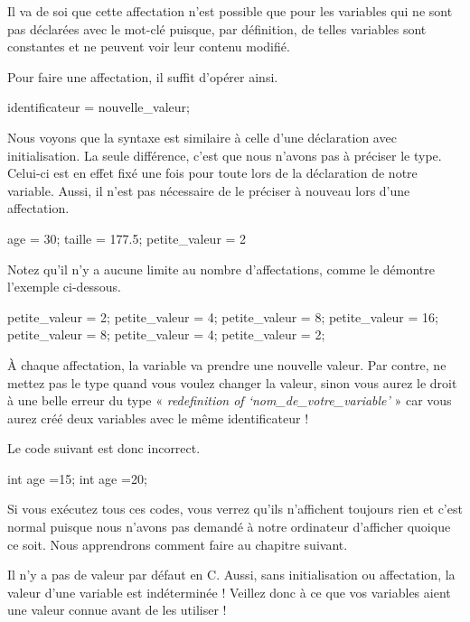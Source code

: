 Il va de soi que cette affectation n'est possible que pour les variables
qui ne sont pas déclarées avec le mot-clé  puisque, par
définition, de telles variables sont constantes et ne peuvent voir leur
contenu modifié.

Pour faire une affectation, il suffit d'opérer ainsi.

\begin{C}
identificateur = nouvelle_valeur;
\end{C}

Nous voyons que la syntaxe est similaire à celle d'une déclaration
avec initialisation. La seule différence, c'est que nous n'avons pas à
préciser le type. Celui-ci est en effet fixé une fois pour toute lors
de la déclaration de notre variable. Aussi, il n'est pas nécessaire de
le préciser à nouveau lors d'une affectation.

\begin{C}
age = 30;
taille = 177.5;
petite_valeur = 2
\end{C}

Notez qu'il n'y a aucune limite au nombre d'affectations, comme le
démontre l'exemple ci-dessous.

\begin{C}
petite_valeur = 2;
petite_valeur = 4;
petite_valeur = 8;
petite_valeur = 16;
petite_valeur = 8;
petite_valeur = 4;
petite_valeur = 2;
\end{C}

À chaque affectation, la variable va prendre une nouvelle valeur. Par
contre, ne mettez pas le type quand vous voulez changer la valeur,
sinon vous aurez le droit à une belle erreur du type «
\emph{redefinition of `nom\_de\_votre\_variable'} » car vous aurez
créé deux variables avec le même identificateur !

Le code suivant est donc incorrect.

\begin{C}
int age =15;
int age =20;
\end{C}

Si vous exécutez tous ces codes, vous verrez qu'ils n'affichent
toujours rien et c'est normal puisque nous n'avons pas demandé à notre
ordinateur d'afficher quoique ce soit. Nous apprendrons comment faire
au chapitre suivant.

\begin{erreurbox} Il n'y a pas de valeur par défaut en C.  Aussi, sans
  initialisation ou affectation, la valeur d'une variable est
  indéterminée ! Veillez donc à ce que vos variables aient une valeur
  connue avant de les utiliser !
\end{erreurbox}

